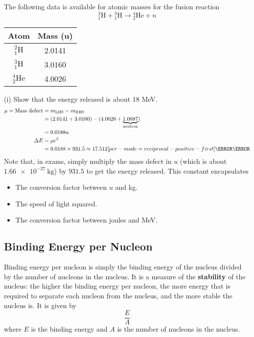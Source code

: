 \documentclass[a4paper,12pt]{article}
\let\oldsi\si
\renewcommand{\si}[1]{\oldsi[per-mode=reciprocal-positive-first]{#1}}
\newcommand{\atom}[3]{{}^{#1}_{#2}\text{#3}}
\begin{document}
The following data is available for atomic masses for the fusion reaction
$$\atom{2}{1}{H} + \atom{3}{1}{H} \rightarrow \atom{4}{2}{He} + n$$
\begin{table}[H]
  \centering
  \begin{tabular}{|c|c|}
    \hline
    Atom              & Mass (u) \\ \hline
    $\atom{2}{1}{H}$  & 2.0141   \\ \hline
    $\atom{3}{1}{H}$  & 3.0160   \\ \hline
    $\atom{4}{2}{He}$ & 4.0026   \\ \hline
  \end{tabular}
\end{table}
(i) Show that the energy released is about 18 MeV.
\begin{align*}
  \mu = \text{Mass defect} & = m_\text{LHS} - m_\text{RHS}                                                        \\
                           & = (2.0141 + 3.0160) - (4.0026 + \underbrace{1.0087}_{\footnotesize{\text{neutron}}}) \\
                           & = 0.0188u                                                                            \\
  \Delta E                 & = \mu c^2
  \\ & = 0.0188 \times 931.5 \approx 17.512 \si{\mega\electronvolt}
\end{align*}
Note that, in exams, simply multiply the mass defect in $u$ (which is about $\SI{1.66e-27}{\kilo\gram}$) by $931.5$ to get the energy released. This constant encapsulates
\begin{itemize}
  \item The conversion factor between $u$ and kg.
  \item The speed of light squared.
  \item The conversion factor between joules and MeV.
\end{itemize}

\pagebreak

\subsection{Binding Energy per Nucleon}

Binding energy per nucleon is simply the binding energy of the nucleus divided by the number of nucleons in the nucleus. It is a measure of the \textbf{stability} of the nucleus: the higher the binding energy per nucleon, the more energy that is required to separate each nucleon from the nucleus, and the more stable the nucleus is. It is given by
$$\frac{E}{A}$$
where $E$ is the binding energy and $A$ is the number of nucleons in the nucleus.
\end{document}
